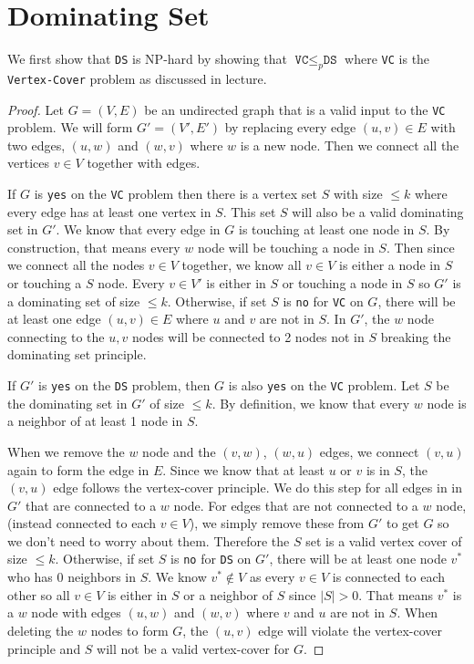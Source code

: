 \documentclass{article}
\begin{document}
\section{Dominating Set}
We first show that \texttt{DS} is NP-hard by showing that $\texttt{VC} \leq_p \texttt{DS}$ where \texttt{VC} is the \texttt{Vertex-Cover} problem as discussed in lecture.
\begin{proof}
    Let $G = (V, E)$ be an undirected graph that is a valid input to the \texttt{VC} problem.
    We will form $G' = (V', E')$ by replacing every edge $(u, v) \in E$ with two edges, $(u, w)$ and $(w, v)$ where $w$ is a new node.
    Then we connect all the vertices $v \in V$ together with edges.

    If $G$ is \texttt{yes} on the \texttt{VC} problem then there is a vertex set $S$ with size $\leq k$ where every edge has at least one vertex in $S$.
    This set $S$ will also be a valid dominating set in $G'$. We know that every edge in $G$ is touching at least one node in $S$.
    By construction, that means every $w$ node will be touching a node in $S$. Then since we connect all the nodes $v \in V$ together, we know all $v \in V$ is either a node in $S$ or touching a $S$ node.
    Every $v \in V'$ is either in $S$ or touching a node in $S$ so $G'$ is a dominating set of size $\leq k$.
    Otherwise, if set $S$ is \texttt{no} for \texttt{VC} on $G$, there will be at least one edge $(u, v) \in E$ where $u$ and $v$ are not in $S$.
    In $G'$, the $w$ node connecting to the $u, v$ nodes will be connected to 2 nodes not in $S$ breaking the dominating set principle.

    If $G'$ is \texttt{yes} on the \texttt{DS} problem, then $G$ is also \texttt{yes} on the \texttt{VC} problem.
    Let $S$ be the dominating set in $G'$ of size $\leq k$. By definition, we know that every $w$ node is a neighbor of at least 1 node in $S$.

    When we remove the $w$ node and the $(v, w)$, $(w, u)$ edges, we connect $(v, u)$ again to form the edge in $E$. 
    Since we know that at least $u$ or $v$ is in $S$, the $(v, u)$ edge follows the vertex-cover principle. 
    We do this step for all edges in in $G'$ that are connected to a $w$ node. For edges that are not connected to a $w$ node, (instead connected to each $v \in V$), we 
    simply remove these from $G'$ to get $G$ so we don't need to worry about them. Therefore the $S$ set is a valid vertex cover of size $\leq k$.
    Otherwise, if set $S$ is \texttt{no} for \texttt{DS} on $G'$, there will be at least one node $v^*$ who has 0 neighbors in $S$.
    We know $v^* \notin V$ as every $v \in V$ is connected to each other so all $v \in V$ is either in $S$ or a neighbor of $S$ since $|S| > 0$.
    That means $v^*$ is a $w$ node with edges $(u, w)$ and $(w, v)$ where $v$ and $u$ are not in $S$. 
    When deleting the $w$ nodes to form $G$, the $(u, v)$ edge will violate the vertex-cover principle and $S$ will not be a valid vertex-cover for $G$.
    
\end{proof}
\end{document}

